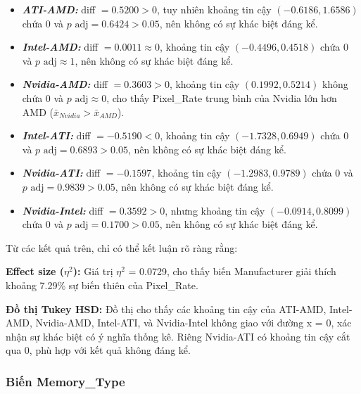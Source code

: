 \begin{itemize}
    \item \textbf{\textit{ATI-AMD:}} diff $= 0.5200 > 0$, tuy nhiên khoảng tin cậy $(-0.6186, 1.6586)$ chứa 0 và $p\text{ adj} = 0.6424 > 0.05$, nên không có sự khác biệt đáng kể.
    
    \item \textbf{\textit{Intel-AMD:}} diff $= 0.0011 \approx 0$, khoảng tin cậy $(-0.4496, 0.4518)$ chứa 0 và $p\text{ adj} \approx 1$, nên không có sự khác biệt đáng kể.
    
    \item \textbf{\textit{Nvidia-AMD:}} diff $= 0.3603 > 0$, khoảng tin cậy $(0.1992, 0.5214)$ không chứa 0 và $p\text{ adj} \approx 0$, cho thấy Pixel\_Rate trung bình của Nvidia lớn hơn AMD ($\bar{x}_{Nvidia} > \bar{x}_{AMD}$).
    
    \item \textbf{\textit{Intel-ATI:}} diff $= -0.5190 < 0$, khoảng tin cậy $(-1.7328, 0.6949)$ chứa 0 và $p\text{ adj} = 0.6893 > 0.05$, nên không có sự khác biệt đáng kể.
    
    \item \textbf{\textit{Nvidia-ATI:}} diff $= -0.1597$, khoảng tin cậy $(-1.2983, 0.9789)$ chứa 0 và $p\text{ adj} = 0.9839 > 0.05$, nên không có sự khác biệt đáng kể.
    
    \item \textbf{\textit{Nvidia-Intel:}} diff $= 0.3592 > 0$, nhưng khoảng tin cậy $(-0.0914, 0.8099)$ chứa 0 và $p\text{ adj} = 0.1700 > 0.05$, nên không có sự khác biệt đáng kể.
\end{itemize}

Từ các kết quả trên, chỉ có thể kết luận rõ ràng rằng:

\begin{center}
\end{center}
    
\textbf{Effect size ($\eta^2$):} Giá trị $\eta^2$ = 0.0729, cho thấy biến Manufacturer giải thích khoảng 7.29\% sự biến thiên của Pixel\_Rate.

\textbf{Đồ thị Tukey HSD:} Đồ thị cho thấy các khoảng tin cậy của ATI-AMD, Intel-AMD, Nvidia-AMD, Intel-ATI, và Nvidia-Intel không giao với đường x = 0, xác nhận sự khác biệt có ý nghĩa thống kê. Riêng Nvidia-ATI có khoảng tin cậy cắt qua 0, phù hợp với kết quả không đáng kể.

\subsubsection{Biến Memory\_Type}

